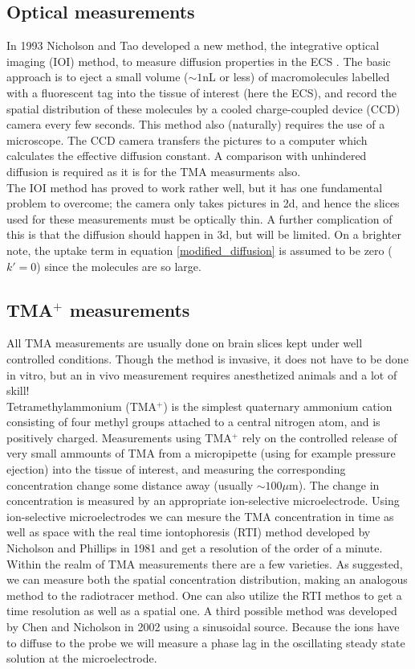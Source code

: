 \documentclass[a4paper,english, 12pt, twoside]{article}
\begin{document}
\subsection{Optical measurements}
In 1993 Nicholson and Tao developed a new method, the integrative optical imaging (IOI) method, to measure diffusion properties in the ECS \cite{nicholson1993hindered} \cite{nicholson2001diffusion}. 
The basic approach is to eject a small volume ($\sim 1$nL or less) of macromolecules labelled with a fluorescent tag into the tissue of interest (here the ECS), and record the spatial distribution of these molecules by a cooled charge-coupled device (CCD) camera every few seconds. 
This method also (naturally) requires the use of a microscope. 
The CCD camera transfers the pictures to a computer which calculates the effective diffusion constant. 
A comparison with unhindered diffusion is required as it is for the TMA measurments also. \\
The IOI method has proved to work rather well, but it has one fundamental problem to overcome; the camera only takes pictures in 2d, and hence the slices used for these measurements must be optically thin. 
A further complication of this is that the diffusion should happen in 3d, but will be limited. 
On a brighter note, the uptake term in equation \ref{modified_diffusion} is assumed to be zero ($k' = 0$) since the molecules are so large.

\subsection{TMA$^+$ measurements}
All TMA measurements are usually done on brain slices kept under well controlled conditions. 
Though the method is invasive, it does not have to be done in vitro, but an in vivo measurement requires anesthetized animals and a lot of skill!\\
Tetramethylammonium (TMA$^+$) is the simplest quaternary ammonium cation consisting of four methyl groups attached to a central nitrogen atom, and is positively charged. 
Measurements using TMA$^+$ rely on the controlled release of very small ammounts of TMA from a micropipette (using for example pressure ejection) into the tissue of interest, and measuring the corresponding concentration change some distance away (usually $\sim100\mu$m). 
The change in concentration is measured by an appropriate ion-selective microelectrode. 
Using ion-selective microelectrodes we can mesure the TMA concentration in time as well as space with the real time iontophoresis (RTI) method developed by Nicholson and Phillips in 1981 \cite{} and get a resolution of the order of a minute.\\
Within the realm of TMA measurements there are a few varieties. 
As suggested, we can measure both the spatial concentration distribution, making an analogous method to the radiotracer method. 
One can also utilize the RTI methos to get a time resolution as well as a spatial one. 
A third possible method was developed by Chen and Nicholson in 2002 \cite{chen2002measurement} using a sinusoidal source. 
Because the ions have to diffuse to the probe we will measure a phase lag in the oscillating steady state solution at the microelectrode. 
\end{document}
